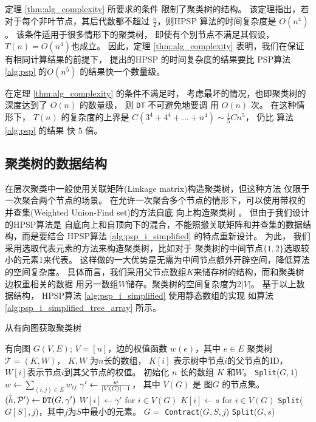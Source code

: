 定理 \ref{thm:alg_complexity} 所要求的条件
限制了聚类树的结构。
该定理指出，若对于每个非叶节点，其后代数都不超过 $\frac{n}{2}$，则HPSP
算法的时间复杂度是  $O(n^4)$。
该条件适用于很多情形下的聚类树，
即使有个别节点不满足其假设，$T(n) = O(n^4)$也成立。
因此，定理 \ref{thm:alg_complexity} 表明，我们在保证有相同计算结果的前提下，
提出的HPSP 的时间复杂度的结果要比
PSP算法 \ref{alg:psp} 的$O(n^5)$ 的结果快一个数量级。

在定理 \ref{thm:alg_complexity} 的条件不满足时，
考虑最坏的情况，也即聚类树的深度达到了 $O(n)$ 的数量级，
则 \texttt{DT} 不可避免地要调 用 $O(n)$ 次。
在这种情形下，
$T(n)$ 的复杂度的上界是 $C(3^4+4^4 + \dots + n^4) \sim \frac{1}{5}Cn^5$，
仍比 算法 \ref{alg:psp} 的结果
快 $5$ 倍。
\subsection{聚类树的数据结构}
在层次聚类中一般使用关联矩阵(Linkage matrix)构造聚类树，但这种方法
仅限于一次聚合两个节点的场景。
在允许一次聚合多个节点的情形下，可以使用带权的并查集(Weighted Union-Find set)的方法自底
向上构造聚类树
\cite{chan2020agglomerative}。 
但由于我们设计的HPSP算法是
自底向上和自顶向下的混合，不能照搬关联矩阵和并查集的数据结构，而是要结合
HPSP算法 \ref{alg:psp_i_simplified} 的特点重新设计。
为此，
我们采用选取代表元素的方法来构造聚类树，比如对于
聚类树的中间节点$\{1,2\}$选取较小的元素1来代表。
这样做的一大优势是无需为中间节点额外开辟空间，降低算法的空间复杂度。
具体而言，我们采用父节点数组$K$来储存树的结构，而和聚类树边权重相关的数据
用另一数组$W$储存。聚类树的空间复杂度为$2|V|$。
基于以上数据结构，
HPSP算法 \ref{alg:psp_i_simplified} 使用静态数组的实现
如算法 \ref{alg:psp_i_simplified_tree_array} 所示。

\begin{algorithm}[!ht]
	\caption{从有向图获取聚类树}\label{alg:psp_i_simplified_tree_array}
	\begin{algorithmic}[1]
		\REQUIRE 有向图 $G(V, E)$; $V=[n]$，边的权值函数 $w(e)$，其中 $e\in E$
		\ENSURE 聚类树 $\mathcal{T}=(K, W)$， $K,W$ 为$n$长的数组，
    $K[i]$ 表示树中节点$i$的父节点的ID，
    $W[i]$表示节点$i$到其父节点的权值。
		\STATE 初始化 $n$ 长的数组 $K$
     和$W$。
		\STATE \texttt{Split}($G, 1$)
		\STATE$w \gets \sum_{(i,j) \in E} w_{ij}$
		\STATE $\gamma' \gets \frac{w}{\abs{V(G)}-1}$，
    其中 $V(G)$ 是 图$G$
    的节点集。
		\STATE $(\tilde{h}, \P')
    \gets \texttt{DT}(G, \gamma')$ 
		\STATE $W[i] \gets \gamma'$ for $ i \in V(G)$
    \STATE $K[i] \gets s$ for $i\in V(G)$
    \ELSE
		\STATE \texttt{Split}($G[S], j$)，其中$j$为$S$中最小的元素。
		\STATE $G=$ \texttt{Contract}($G, S, j$) \label{alg:contract}
    \ENDFOR 
		\STATE \texttt{Split}($G, s$)
		\ENDIF
		\ENDFUNCTION
	\end{algorithmic}
\end{algorithm}

